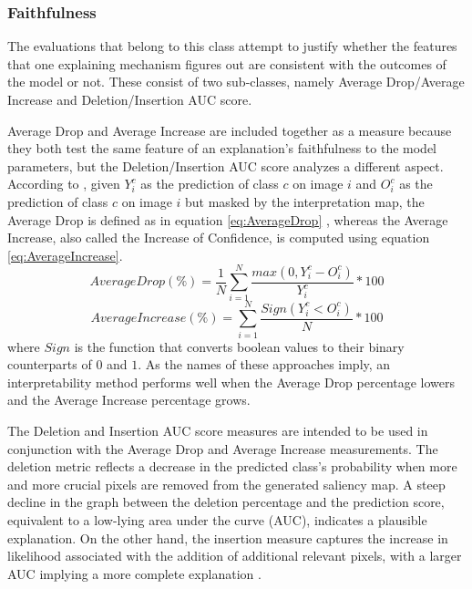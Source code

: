 \documentclass{svproc}
\begin{document}
\subsubsection{Faithfulness}

The evaluations that belong to this class attempt to justify whether the features that one explaining mechanism figures out are consistent with the outcomes of the model or not. These consist of two sub-classes, namely Average Drop/Average Increase and Deletion/Insertion AUC score. 

Average Drop and Average Increase are included together as a measure because they both test the same feature of an explanation's faithfulness to the model parameters, but the Deletion/Insertion AUC score analyzes a different aspect. According to \cite{chattopadhay2018grad}, given $Y^c_i$ as the prediction of class $c$ on image $i$ and $O^c_i$ as the prediction of class $c$ on image $i$ but masked by the interpretation map, the Average Drop is defined as in equation \ref{eq:AverageDrop} \cite{wang2020score}, whereas the Average Increase, also called the Increase of Confidence, is computed using equation \ref{eq:AverageIncrease}. \\
\begin{equation}
AverageDrop(\%) = \frac{1}{N} \sum^N_{i=1}\frac{max(0, Y^c_i - O^c_i)}{Y^c_i}*100
\label{eq:AverageDrop}
\end{equation}
\begin{equation}
AverageIncrease(\%) = \sum^N_{i=1}\frac{Sign(Y^c_i < O^c_i)}{N}*100
\label{eq:AverageIncrease}
\end{equation}
where $Sign$ is the function that converts boolean values to their binary counterparts of $0$ and $1$. As the names of these approaches imply, an interpretability method performs well when the Average Drop percentage lowers and the Average Increase percentage grows.

The Deletion and Insertion AUC score measures are intended to be used in conjunction with the Average Drop and Average Increase measurements. The deletion metric reflects a decrease in the predicted class's probability when more and more crucial pixels are removed from the generated saliency map. A steep decline in the graph between the deletion percentage and the prediction score, equivalent to a low-lying area under the curve (AUC), indicates a plausible explanation. On the other hand, the insertion measure captures the increase in likelihood associated with the addition of additional relevant pixels, with a larger AUC implying a more complete explanation \cite{wang2020score}.
\end{document}
